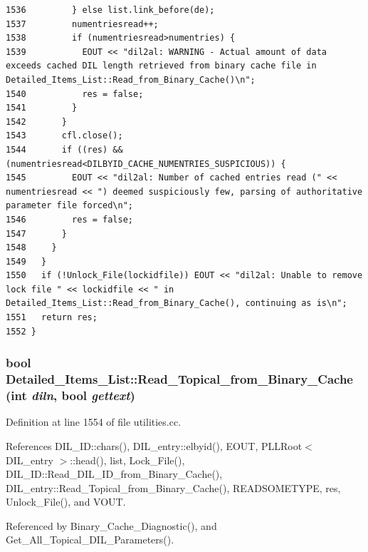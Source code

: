 \begin{verbatim}
1536         } else list.link_before(de);
1537         numentriesread++;
1538         if (numentriesread>numentries) {
1539           EOUT << "dil2al: WARNING - Actual amount of data exceeds cached DIL length retrieved from binary cache file in Detailed_Items_List::Read_from_Binary_Cache()\n";
1540           res = false;
1541         }
1542       }
1543       cfl.close();
1544       if ((res) && (numentriesread<DILBYID_CACHE_NUMENTRIES_SUSPICIOUS)) {
1545         EOUT << "dil2al: Number of cached entries read (" << numentriesread << ") deemed suspiciously few, parsing of authoritative parameter file forced\n";
1546         res = false;
1547       }
1548     }
1549   }
1550   if (!Unlock_File(lockidfile)) EOUT << "dil2al: Unable to remove lock file " << lockidfile << " in Detailed_Items_List::Read_from_Binary_Cache(), continuing as is\n";
1551   return res;
1552 }
\end{verbatim}\normalsize 
{}
\subsubsection{\setlength{\rightskip}{0pt plus 5cm}bool Detailed\_\-Items\_\-List::Read\_\-Topical\_\-from\_\-Binary\_\-Cache (int {\em diln}, bool {\em gettext})\hspace{0.3cm}{\tt  [protected]}}\label{classDetailed__Items__List_b3}




Definition at line 1554 of file utilities.cc.

References DIL\_\-ID::chars(), DIL\_\-entry::elbyid(), EOUT, PLLRoot$<$ DIL\_\-entry $>$::head(), list, Lock\_\-File(), DIL\_\-ID::Read\_\-DIL\_\-ID\_\-from\_\-Binary\_\-Cache(), DIL\_\-entry::Read\_\-Topical\_\-from\_\-Binary\_\-Cache(), READSOMETYPE, res, Unlock\_\-File(), and VOUT.

Referenced by Binary\_\-Cache\_\-Diagnostic(), and Get\_\-All\_\-Topical\_\-DIL\_\-Parameters().



